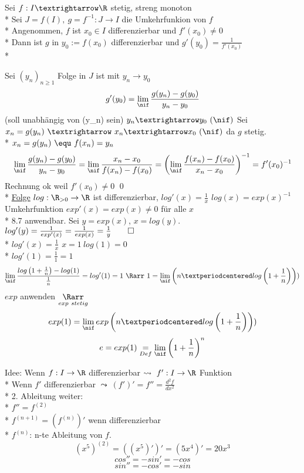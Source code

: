 Sei $f:I→\R$ stetig, streng monoton\\*
Sei $J=f(I),\ g=f^{-1}:J→I$ die Umkehrfunkion von $f$\\*
Angenommen, $f$ ist $x_0\in I$ differenzierbar und $f'(x_0)≠0$\\*
Dann ist $g$ in $y_0:=f(x_0)$ differenzierbar und $g'(y_0)=\frac{1}{f'(x_0)}$\\*
\bew
Sei $(y_n)_{n\geq 1}$ Folge in $J$ ist mit $y_n→y_0$
$$g'(y_0)=\lim_{\nif}\frac{g(y_n)-g(y_0)}{y_n-y_0}$$
\hfill(soll unabhängig von (y_n) sein)
$y_n→y_0\ (\nif)$ Sei $x_n=g(y_n)\ →\ x_n→x_0\ (\nif)$ da $g$ stetig.\\*
$x_n=g(y_n)\ \equ\ f(x_n)=y_n$
$$\lim_{\nif}\frac{g(y_n)-g(y_0)}{y_n-y_0}=\lim_{\nif}\frac{x_n-x_0}{f(x_n)-f(x_0)}=\left(\lim_{\nif}\frac{f(x_n)-f(x_0)}{x_n-x_0}\right)^{-1}=f'(x_0)^{-1}$$
Rechnung ok weil $f'(x_0)≠0$ \qed\\*
\ul{Folge} $log: \R_{>0}\to \R$ ist differenzierbar, $log'(x) = \frac{1}{x}$
\bew
$log(x) = exp(x)^{-1}$ Umkehrfunktion $exp'(x) = exp(x) \neq 0$ für alle $x$\\*
\Rarr{} 8.7 anwendbar. Sei $y = exp(x)$, $x = log(y)$.
$log'(y) = \frac{1}{exp'(x)} = \frac{1}{exp(x)} = \frac{1}{y}\qed$\\*
$log'(x)=\frac{1}{x}$
$x=1\ log(1)=0$\\*
$log'(1)=\frac{1}{1}=1$
$$\lim_{\nif}\frac{log\left(1+\frac{1}{n}\right)-log(1)}{\frac{1}{n}}=log'(1)=1\ \Rarr\ 1=\lim_{\nif}\left(n·log\left(1+\frac{1}{n}\right)\right))$$
$exp$ anwenden $\underset{exp\ stetig}{\Rarr}$
$$exp(1)=\lim_{\nif}exp\left(n·log\left(1+\frac{1}{n}\right)\right))$$
$$e=exp(1)\underset{Def}{=}\lim_{\nif}\left(1+\frac{1}{n}\right)^n$$

Idee: Wenn $f: I \to \R$ differenzierbar $ \leadsto\ f':I \to \R$ Funktion\\*
Wenn $f'$ differenzierbar $ \leadsto\ (f')' = f'' = \frac{d^2f}{dx^2}$\\*
2. Ableitung weiter:\\*
$f'' = f^{(2)}$\\*
$f^{(n+1)} = (f^{(n)})'$ wenn differenzierbar\\*
$f^{(n)}$: n-te Ableitung von $f$.
\bsp
$$(x^5)^{(2)} = ((x^5)')' = (5x^4)' = 20x^3$$
$$cos'' = -sin' = -cos$$
$$sin'' = -cos' = -sin$$

